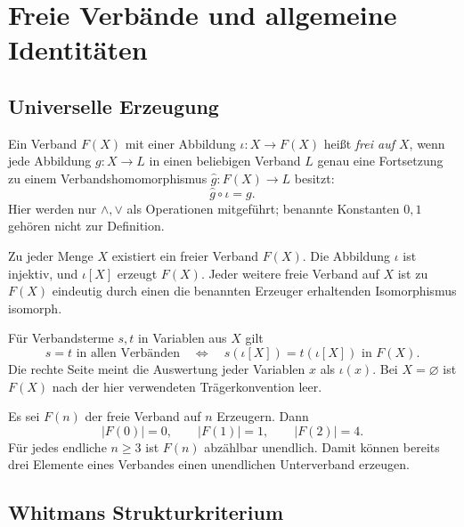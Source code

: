 \chapter{Freie Verbände und allgemeine Identitäten}
\label{b45guide:ch:free}

\section{Universelle Erzeugung}

\begin{definition}
\label{b45guide:def:free-lattice}
Ein Verband $F(X)$ mit einer Abbildung $\iota:X\to F(X)$ heißt
\emph{frei auf $X$}, wenn jede Abbildung $g:X\to L$ in einen
beliebigen Verband $L$ genau eine Fortsetzung zu einem
Verbandshomomorphismus $\widehat g:F(X)\to L$ besitzt:
\[
 \widehat g\circ\iota=g.
\]
Hier werden nur $\wedge,\vee$ als Operationen mitgeführt;
benannte Konstanten $0,1$ gehören nicht zur Definition.
\end{definition}

\begin{theorem}
\label{b45guide:thm:free-existence}
Zu jeder Menge $X$ existiert ein freier Verband $F(X)$.
Die Abbildung $\iota$ ist injektiv, und $\iota[X]$ erzeugt $F(X)$.
Jeder weitere freie Verband auf $X$ ist zu $F(X)$ eindeutig
durch einen die benannten Erzeuger erhaltenden Isomorphismus isomorph.

Für Verbandsterme $s,t$ in Variablen aus $X$ gilt
\[
 s=t\text{ in allen Verbänden}
 \quad\Longleftrightarrow\quad
 s(\iota[X])=t(\iota[X])\text{ in }F(X).
\]
Die rechte Seite meint die Auswertung jeder Variablen $x$ als
$\iota(x)$. Bei $X=\varnothing$ ist $F(X)$ nach der hier
verwendeten Trägerkonvention leer. \cite{nation-free}
\end{theorem}

\begin{theorem}
\label{b45guide:thm:free-size}
Es sei $F(n)$ der freie Verband auf $n$ Erzeugern. Dann
\[
 |F(0)|=0,\qquad |F(1)|=1,\qquad |F(2)|=4.
\]
Für jedes endliche $n\geq3$ ist $F(n)$ abzählbar unendlich.
Damit können bereits drei Elemente eines Verbandes einen
unendlichen Unterverband erzeugen. \cite{nation-free}
\end{theorem}

\section{Whitmans Strukturkriterium}

